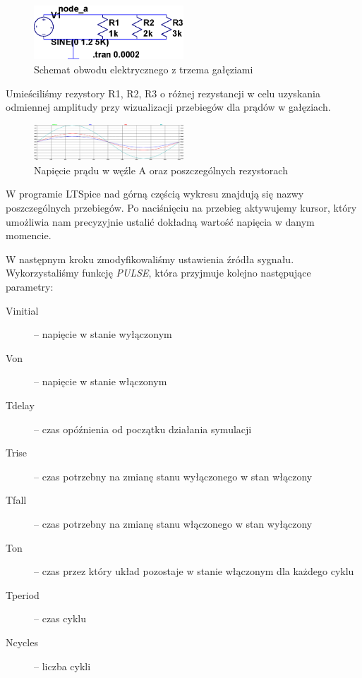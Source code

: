 \documentclass[polish,polish,a4paper]{article}
\begin{document}
\begin{figure}[H]
    \centering
    \includegraphics[width=0.5\textwidth]{01uklad.eps}
    \caption{Schemat obwodu elektrycznego z trzema gałęziami}
\end{figure}

Umieściliśmy rezystory R1, R2, R3 o różnej rezystancji w celu uzyskania odmiennej amplitudy przy wizualizacji przebiegów dla prądów w gałęziach.


\begin{figure}[H]
    \centering
    \includegraphics[width=0.5\textwidth]{01.eps}
    \caption{Napięcie prądu w węźle A oraz poszczególnych rezystorach}
\end{figure}

W programie LTSpice nad górną częścią wykresu znajdują się nazwy poszczególnych przebiegów. Po naciśnięciu na przebieg aktywujemy kursor, który umożliwia nam precyzyjnie ustalić dokładną wartość napięcia w danym momencie.

W następnym kroku zmodyfikowaliśmy ustawienia źródła sygnału. Wykorzystaliśmy funkcję \emph{PULSE}, która przyjmuje kolejno następujące parametry:

\begin{description}
\item [Vinitial] -- napięcie w stanie wyłączonym
\item [Von] -- napięcie w stanie włączonym
\item [Tdelay] -- czas opóźnienia od początku działania symulacji
\item [Trise] -- czas potrzebny na zmianę stanu wyłączonego w stan włączony
\item [Tfall] -- czas potrzebny na zmianę stanu włączonego w stan wyłączony
\item [Ton] -- czas przez który układ pozostaje w stanie włączonym dla każdego cyklu
\item [Tperiod] -- czas cyklu
\item [Ncycles] -- liczba cykli
\end{description}
\end{document}
